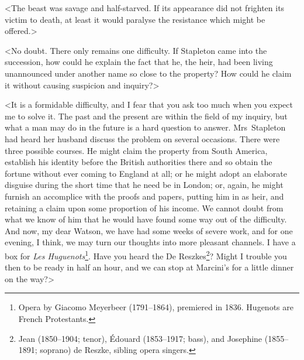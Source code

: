 <The beast was savage and half-starved. If its appearance did not frighten its victim to death, at least it would paralyse the resistance which might be offered.>

<No doubt. There only remains one difficulty. If Stapleton came into the succession, how could he explain the fact that he, the heir, had been living unannounced under another name so close to the property? How could he claim it without causing suspicion and inquiry?>

\begin{withfootnotes}
<It is a formidable difficulty, and I fear that you ask too much when you expect me to solve it. The past and the present are within the field of my inquiry, but what a man may do in the future is a hard question to answer. Mrs~Stapleton had heard her husband discuss the problem on several occasions. There were three possible courses. He might claim the property from South America, establish his identity before the British authorities there and so obtain the fortune without ever coming to England at all; or he might adopt an elaborate disguise during the short time that he need be in London; or, again, he might furnish an accomplice with the proofs and papers, putting him in as heir, and retaining a claim upon some proportion of his income. We cannot doubt from what we know of him that he would have found some way out of the difficulty. And now, my dear Watson, we have had some weeks of severe work, and for one evening, I think, we may turn our thoughts into more pleasant channels. I have a box for \textit{Les Huguenots}\footnote{Opera by Giacomo Meyerbeer (1791--1864), premiered in 1836. Hugenots are French Protestants.}. Have you heard the De Reszkes\footnote{Jean (1850--1904; tenor), Édouard (1853--1917; bass), and Josephine (1855--1891; soprano) de Reszke, sibling opera singers.}? Might I trouble you then to be ready in half an hour, and we can stop at Marcini's for a little dinner on the way?>
\end{withfootnotes}

